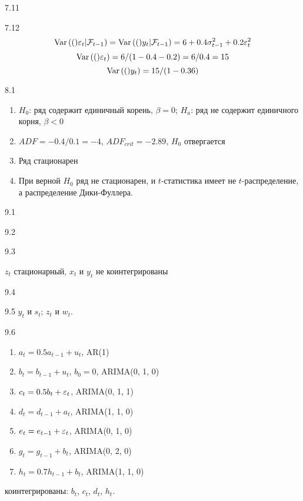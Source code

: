 \protect \hypertarget {soln:7.11}{}
\begin{solution}{{7.11}}

\end{solution}
\protect \hypertarget {soln:7.12}{}
\begin{solution}{{7.12}}
\[
\operatorname{Var}{\left((\right)}\varepsilon_t | \mathcal{F}_{t-1}) = \operatorname{Var}{\left((\right)}y_t| \mathcal{F}_{t-1}) = 6 + 0.4 \sigma^2_{t-1} + 0.2\varepsilon_t^2
\]
\[
\operatorname{Var}{\left((\right)}\varepsilon_t) = 6/(1-0.4-0.2)=6/0.4=15
\]
\[
\operatorname{Var}{\left((\right)}y_t)=15/(1-0.36)
\]
\end{solution}
\protect \hypertarget {soln:8.1}{}
\begin{solution}{{8.1}}

\begin{enumerate}
\item $H_0$: ряд содержит единичный корень, $\beta=0$; $H_a$: ряд не содержит единичного корня, $\beta<0$
\item $ADF=-0.4/0.1=-4$, $ADF_{crit}=-2.89$, $H_0$ отвергается
\item Ряд стационарен
\item При верной $H_0$ ряд не стационарен, и  $t$-статистика имеет не $t$-распределение, а распределение Дики-Фуллера.
\end{enumerate}
\end{solution}
\protect \hypertarget {soln:9.1}{}
\begin{solution}{{9.1}}

\end{solution}
\protect \hypertarget {soln:9.2}{}
\begin{solution}{{9.2}}

\end{solution}
\protect \hypertarget {soln:9.3}{}
\begin{solution}{{9.3}}

$z_t$ стационарный, $x_t$ и $y_t$ не коинтегрированы
\end{solution}
\protect \hypertarget {soln:9.4}{}
\begin{solution}{{9.4}}

\end{solution}
\protect \hypertarget {soln:9.5}{}
\begin{solution}{{9.5}}
$y_t$ и $s_t$; $z_t$ и $w_t$.
\end{solution}
\protect \hypertarget {soln:9.6}{}
\begin{solution}{{9.6}}
  \begin{enumerate}
    \item $a_t = 0.5 a_{t-1} + u_t$, AR(1)
    \item $b_t = b_{t-1} + u_t$, $b_0 = 0$, ARIMA(0, 1, 0)
    \item $c_t = 0.5 b_t + \varepsilon_t$, ARIMA(0, 1, 1)
    \item $d_t = d_{t-1} + a_t$, ARIMA(1, 1, 0)
    \item $e_t = e_{t-1} + \varepsilon_t$, ARIMA(0, 1, 0)
    \item $g_t = g_{t-1} + b_t$, ARIMA(0, 2, 0)
    \item $h_t = 0.7 h_{t-1} + b_t$, ARIMA(1, 1, 0)
  \end{enumerate}
  коинтегрированы: $b_t$, $c_t$, $d_t$, $h_t$.
\end{solution}
